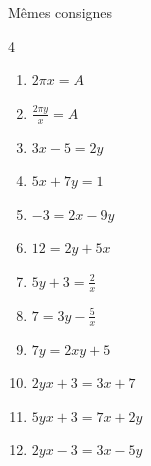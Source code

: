 \begin{exercise}[à vous] \label{chapter07:exercice:equationE} Mêmes consignes

\begin{multicols}{4}
	\begin{enumerate}[label={\alph*)\rule{0pt}{1.6em}},leftmargin =*] 
		\item $2\pi x  =A$  
		\item $\tfrac{2\pi y}{x}  =A$    
		\item $3x-5=2y$ 
		\item $5x+7y=1$
		\item $-3=2x-9y$
		\item $12=2y+5x$
		\item $5y+3=\tfrac{2}{x}$
		\item $7=3y-\tfrac{5}{x}$
		\item $7y=2xy+5$ 
		\item $2yx+3= 3x+7$
		\item $5yx+3= 7x+2y$
		\item $2yx-3= 3x-5y$
	\end{enumerate}
\end{multicols}
\end{exercise} 
%	 

